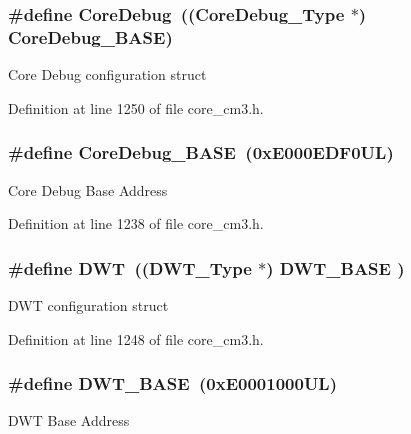 \subsubsection[{\texorpdfstring{Core\+Debug}{CoreDebug}}]{\setlength{\rightskip}{0pt plus 5cm}\#define Core\+Debug~(({\bf Core\+Debug\+\_\+\+Type} $\ast$)     {\bf Core\+Debug\+\_\+\+B\+A\+SE})}\hypertarget{group__CMSIS__core__base_gab6e30a2b802d9021619dbb0be7f5d63d}{}\label{group__CMSIS__core__base_gab6e30a2b802d9021619dbb0be7f5d63d}
Core Debug configuration struct 

Definition at line 1250 of file core\+\_\+cm3.\+h.

\subsubsection[{\texorpdfstring{Core\+Debug\+\_\+\+B\+A\+SE}{CoreDebug_BASE}}]{\setlength{\rightskip}{0pt plus 5cm}\#define Core\+Debug\+\_\+\+B\+A\+SE~(0x\+E000\+E\+D\+F0\+U\+L)}\hypertarget{group__CMSIS__core__base_ga680604dbcda9e9b31a1639fcffe5230b}{}\label{group__CMSIS__core__base_ga680604dbcda9e9b31a1639fcffe5230b}
Core Debug Base Address 

Definition at line 1238 of file core\+\_\+cm3.\+h.

\subsubsection[{\texorpdfstring{D\+WT}{DWT}}]{\setlength{\rightskip}{0pt plus 5cm}\#define D\+WT~(({\bf D\+W\+T\+\_\+\+Type}       $\ast$)     {\bf D\+W\+T\+\_\+\+B\+A\+SE}      )}\hypertarget{group__CMSIS__core__base_gabbe5a060185e1d5afa3f85b14e10a6ce}{}\label{group__CMSIS__core__base_gabbe5a060185e1d5afa3f85b14e10a6ce}
D\+WT configuration struct 

Definition at line 1248 of file core\+\_\+cm3.\+h.

\subsubsection[{\texorpdfstring{D\+W\+T\+\_\+\+B\+A\+SE}{DWT_BASE}}]{\setlength{\rightskip}{0pt plus 5cm}\#define D\+W\+T\+\_\+\+B\+A\+SE~(0x\+E0001000\+U\+L)}\hypertarget{group__CMSIS__core__base_gafdab534f961bf8935eb456cb7700dcd2}{}\label{group__CMSIS__core__base_gafdab534f961bf8935eb456cb7700dcd2}
D\+WT Base Address 

